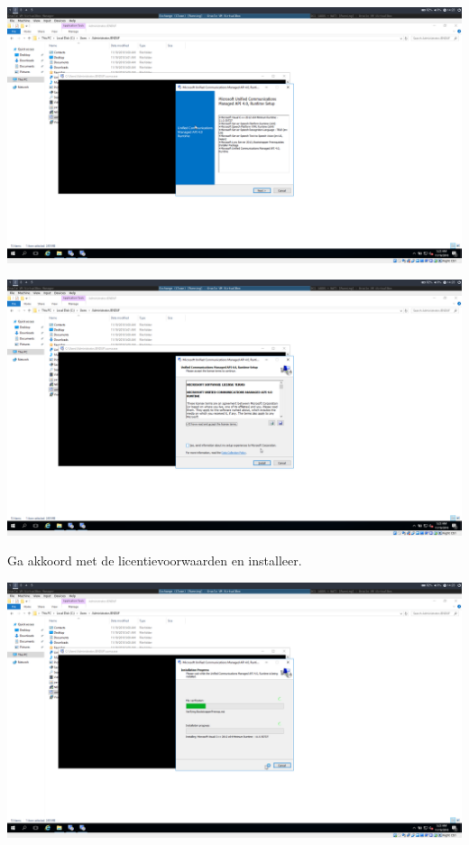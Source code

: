 \documentclass[a4paper]{article}
\begin{document}
	\begin{center}
	\includegraphics[width=15cm]{Pictures/Exchange/Pre/1542633810.png}
\end{center}
	\begin{center}
	\includegraphics[width=15cm]{Pictures/Exchange/Pre/1542633813.png}
	
	Ga akkoord met de licentievoorwaarden en installeer.
\end{center}
	\begin{center}
	\includegraphics[width=15cm]{Pictures/Exchange/Pre/1542633816.png}
\end{center}
\end{document}
